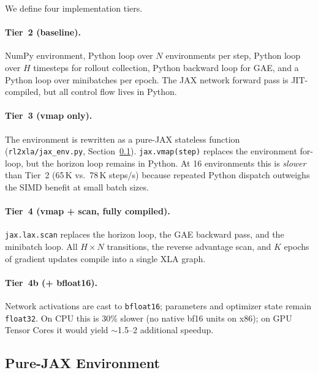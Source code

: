 \documentclass[11pt,twocolumn]{article}
\begin{document}
We define four implementation tiers.

\paragraph{Tier~2 (baseline).}
NumPy environment, Python loop over $N$ environments per step, Python loop
over $H$ timesteps for rollout collection, Python backward loop for GAE, and
a Python loop over minibatches per epoch. The JAX network forward pass is
JIT-compiled, but all control flow lives in Python.

\paragraph{Tier~3 (vmap only).}
The environment is rewritten as a pure-JAX stateless function
(\texttt{rl2xla/jax\_env.py}, Section~\ref{sec:env}).
\texttt{jax.vmap(step)} replaces the environment for-loop, but the horizon
loop remains in Python. At 16 environments this is \emph{slower} than Tier~2
(65\,K vs.\ 78\,K steps/s) because repeated Python dispatch outweighs the
SIMD benefit at small batch sizes.

\paragraph{Tier~4 (vmap + scan, fully compiled).}
\texttt{jax.lax.scan} replaces the horizon loop, the GAE backward pass, and
the minibatch loop. All $H \times N$ transitions, the reverse advantage scan,
and $K$ epochs of gradient updates compile into a single XLA graph.

\paragraph{Tier~4b (+ bfloat16).}
Network activations are cast to \texttt{bfloat16}; parameters and optimizer
state remain \texttt{float32}. On CPU this is 30\% slower (no native bf16
units on x86); on GPU Tensor Cores it would yield $\sim$1.5--2\texttimes{}
additional speedup.

\subsection{Pure-JAX Environment}
\label{sec:env}
\end{document}
